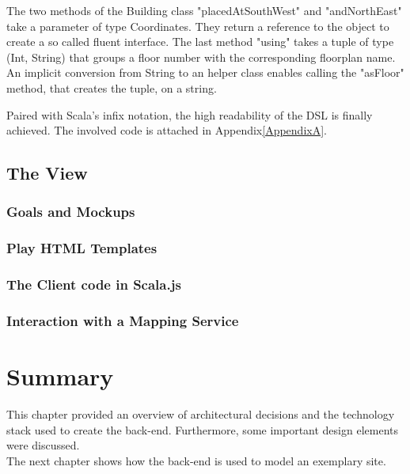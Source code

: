 The two methods of the Building class "placedAtSouthWest" and "andNorthEast" take a parameter of type Coordinates. They return a reference to the object to create a so called fluent interface. %
The last method "using" takes a tuple of type (Int, String) that groups a floor number with the corresponding floorplan name. An implicit conversion from String to an helper class enables calling the "asFloor" method, that creates the tuple, on a string.

Paired with Scala's infix notation, the high readability of the DSL is finally achieved. 
The involved code is attached in Appendix\ref{AppendixA}.

\subsection{The View}

\subsubsection{Goals and Mockups}

\subsubsection{Play HTML Templates}


\subsubsection{The Client code in Scala.js}


\subsubsection{Interaction with a Mapping Service}


\section{Summary}

This chapter provided an overview of architectural decisions and the technology stack used to create the back-end. Furthermore, some important design elements were discussed.\\ 
The next chapter shows how the back-end is used to model an exemplary site.
